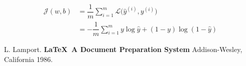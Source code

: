 \documentclass[12pt,reqno]{book}      %
\begin{document}
\begin{align}
\mathscr{J}(w,b) &= \dfrac{1}{m} \sum_{i = 1}^{m} \mathscr{L} \big( \hat{y}^{(i)}, y^{(i)} \big) \\
&= - \dfrac{1}{m} \sum_{i = 1}^{m} y \log \hat{y} + (1 - y) \log  (1 - \hat{y})
\end{align}


\pagestyle{headings}




\begin{thebibliography}{99}
 L. Lamport. {\bf \LaTeX \ A Document Preparation System}
Addison-Wesley, California 1986.
\end{thebibliography}


\end{document}
